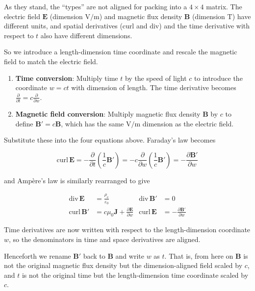 As they stand, the ``types'' are not aligned for packing into a
\(4\times4\) matrix. The electric field \(\mathbf{E}\) (dimension
\(\mathrm{V/m}\)) and magnetic flux density \(\mathbf{B}\) (dimension
\(\mathrm{T}\)) have different units, and spatial derivatives
(\(\mathrm{curl}\) and \(\mathrm{div}\)) and the time derivative with
respect to \(t\) also have different dimensions.

So we introduce a length-dimension time coordinate and rescale the
magnetic field to match the electric field.

\begin{enumerate}
\def\labelenumi{\arabic{enumi}.}
\item
  \textbf{Time conversion}: Multiply time \(t\) by the speed of light
  \(c\) to introduce the coordinate \(w = ct\) with dimension of length.
  The time derivative becomes
  \(\frac{\partial}{\partial t} = c\frac{\partial}{\partial w}\).
\item
  \textbf{Magnetic field conversion}: Multiply magnetic flux density
  \(\mathbf{B}\) by \(c\) to define \(\mathbf{B}' = c\mathbf{B}\), which
  has the same \(\mathrm{V/m}\) dimension as the electric field.
\end{enumerate}

Substitute these into the four equations above. Faraday's law becomes

\[\mathrm{curl}\,\mathbf{E} = -\frac{\partial}{\partial t}\!\left(\frac{1}{c}\mathbf{B}'\right) = -c\frac{\partial}{\partial w}\!\left(\frac{1}{c}\mathbf{B}'\right) = -\frac{\partial \mathbf{B}'}{\partial w}\]

and Ampère's law is similarly rearranged to give

\[\begin{aligned}
\mathrm{div}\,\mathbf{E} &= \frac{\rho_{\mathrm e}}{\varepsilon_0} &
\mathrm{div}\,\mathbf{B}' &= 0 \\[0.5em]
\mathrm{curl}\,\mathbf{B}' &= c\mu_0\mathbf{J} + \frac{\partial \mathbf{E}}{\partial w} &
\mathrm{curl}\,\mathbf{E} &= -\frac{\partial \mathbf{B}'}{\partial w}
\end{aligned}\]

Time derivatives are now written with respect to the length-dimension
coordinate \(w\), so the denominators in time and space derivatives are
aligned.

Henceforth we rename \(\mathbf{B}'\) back to \(\mathbf{B}\) and write
\(w\) as \(t\). That is, from here on \(\mathbf{B}\) is not the original
magnetic flux density but the dimension-aligned field scaled by \(c\),
and \(t\) is not the original time but the length-dimension time
coordinate scaled by \(c\).

